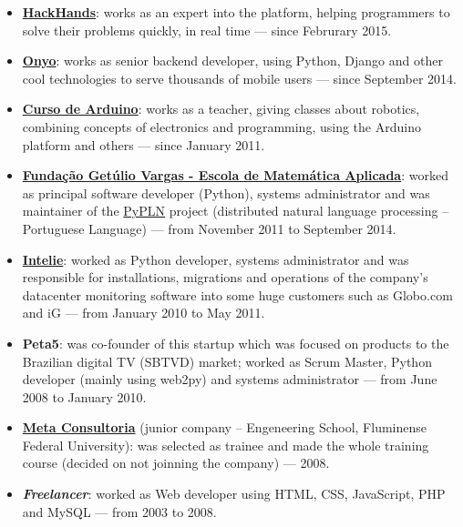 \documentclass[a4paper,11pt]{article}
\begin{document}
	\begin{itemize}
		\item \href{http://hackhands.com}{\textbf{HackHands}}: works as an
			expert into the platform, helping programmers to solve their
			problems quickly, in real time --- since Februrary 2015.
		\item \href{http://onyo.com}{\textbf{Onyo}}: works as senior backend
			developer, using Python, Django and other cool technologies to
			serve thousands of mobile users --- since September 2014.
		\item \href{http://www.cursodearduino.com.br/}{\textbf{Curso de
			Arduino}}: works as a teacher, giving classes about robotics,
			combining concepts of electronics and programming, using the
			Arduino platform and others --- since January 2011.
		\item \href{http://emap.fgv.br/}{\textbf{Fundação Getúlio Vargas -
			Escola de Matemática Aplicada}}: worked as principal software
			developer (Python), systems administrator and was maintainer of the
			\href{http://pypln.org/}{PyPLN} project (distributed natural
			language processing -- Portuguese Language) --- from November 2011
			to September 2014.
		\item \href{http://www.intelie.com.br/}{\textbf{Intelie}}: worked as
			Python developer, systems administrator and was responsible for
			installations, migrations and operations of the company's
			datacenter monitoring software into some huge customers such as
			Globo.com and iG --- from January 2010 to May 2011.
		\item \textbf{Peta5}: was co-founder of this startup which was focused
			on products to the Brazilian digital TV (SBTVD) market; worked as
			Scrum Master, Python developer (mainly using web2py) and systems
			administrator --- from June 2008 to January 2010.
		\item \href{http://www.metaconsultoria.com/}{\textbf{Meta Consultoria}}
			(junior company -- Engeneering School, Fluminense Federal
			University): was selected as trainee and made the whole training
			course (decided on not joinning the company) --- 2008.
		\item \textbf{\textit{Freelancer}}: worked as Web developer using HTML,
			CSS, JavaScript, PHP and MySQL --- from 2003 to 2008.
	\end{itemize}
\end{document}
